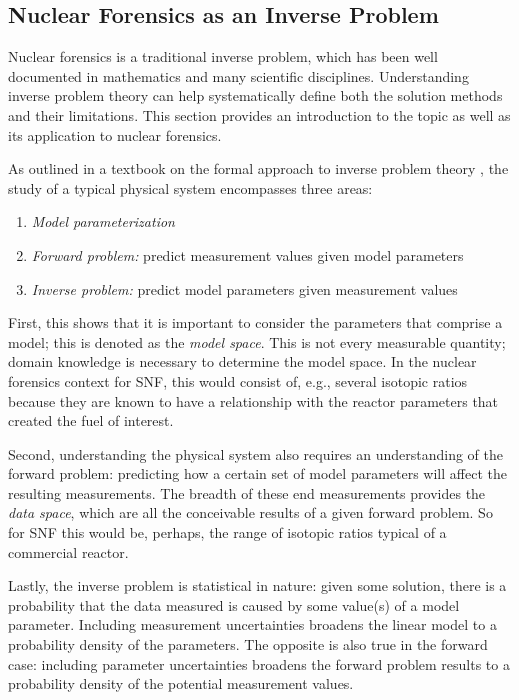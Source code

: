 \subsection{Nuclear Forensics as an Inverse Problem}
\label{sec:inverse}

Nuclear forensics is a traditional inverse problem, which has been well
documented in mathematics and many scientific disciplines.  Understanding
inverse problem theory can help systematically define both the solution methods
and their limitations. This section provides an introduction to the topic as
well as its application to nuclear forensics. 

As outlined in a textbook on the formal approach to inverse problem theory
\cite{inverse_theory}, the study of a typical physical system encompasses three
areas:
\begin{enumerate}
  \itemsep-0.75em
  \item \textit{Model parameterization}
  \item \textit{Forward problem:} predict measurement values given model parameters
  \item \textit{Inverse problem:} predict model parameters given measurement values
\end{enumerate}

First, this shows that it is important to consider the parameters that comprise
a model; this is denoted as the \textit{model space}. This is not every
measurable quantity; domain knowledge is necessary to determine the model
space. In the nuclear forensics context for \gls{SNF}, this would consist of,
e.g., several isotopic ratios because they are known to have a relationship
with the reactor parameters that created the fuel of interest.

Second, understanding the physical system also requires an understanding of the
forward problem: predicting how a certain set of model parameters will affect
the resulting measurements. The breadth of these end measurements provides the
\textit{data space}, which are all the conceivable results of a given forward
problem. So for \gls{SNF} this would be, perhaps, the range of isotopic ratios
typical of a commercial reactor. 

Lastly, the inverse problem is statistical in nature: given some solution,
there is a probability that the data measured is caused by some value(s) of a
model parameter. Including measurement uncertainties broadens the linear model
to a probability density of the parameters. The opposite is also true in the
forward case: including parameter uncertainties broadens the forward problem
results to a probability density of the potential measurement values.

